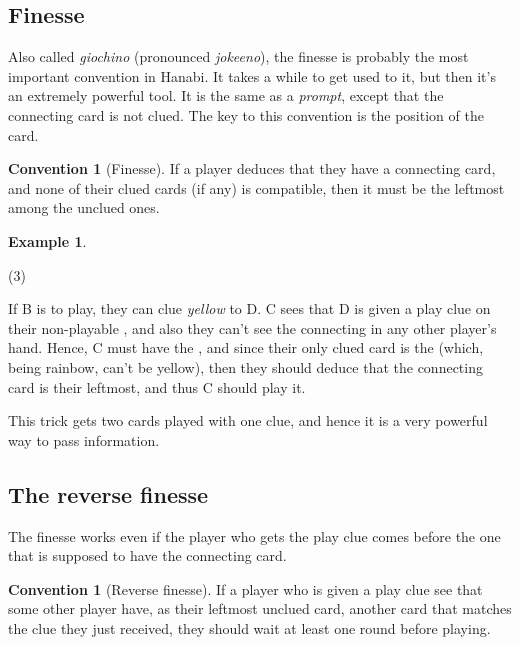 \documentclass[a4paper]{article}
\theoremstyle{plain}
\theoremstyle{definition}
\newtheorem{example}[theorem]{Example}
\newtheorem{convention}[theorem]{Convention}
\begin{document}
\subsection{Finesse}
\label{sec:finesse}

Also called \textit{giochino} (pronounced \textit{jokeeno}), the finesse is probably the most important convention in Hanabi. It takes a while to get used to it, but then it's an extremely powerful tool. It is the same as a \textit{prompt}, except that the connecting card is not clued. The key to this convention is the position of the card.

\begin{convention}[Finesse]
	\label{finesse}
	If a player deduces that they have a connecting card, and none of their clued cards (if any) is compatible, then it must be the leftmost among the unclued ones.
\end{convention}

\begin{example}
	\hfill
	\begin{tasks}(3)
		\task[+]      
		\task[A]    
		\task[B]    
		\task[C]    
		\task[D]    
		\task[E]    
	\end{tasks}
	
	If B is to play, they can clue \textit{yellow} to D. C sees that D is given a play clue on their non-playable , and also they can't see the connecting  in any other player's hand. Hence, C must have the , and since their only clued card is the  (which, being rainbow, can't be yellow), then they should deduce that the connecting card is their leftmost, and thus C should play it.
\end{example}

This trick gets two cards played with one clue, and hence it is a very powerful way to pass information.

\subsection{The reverse finesse}

The finesse works even if the player who gets the play clue comes before the one that is supposed to have the connecting card. 

\begin{convention}[Reverse finesse]
	If a player who is given a play clue see that some other player have, as their leftmost unclued card, another card that matches the clue they just received, they should wait at least one round before playing.
\end{convention}
\end{document}
